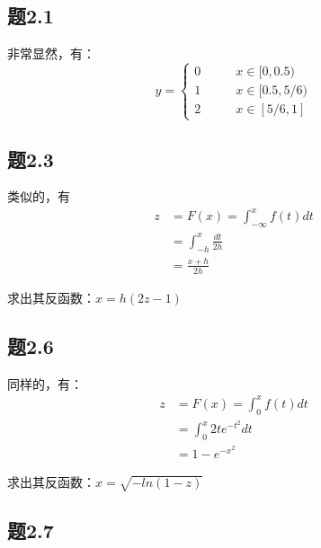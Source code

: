 \documentclass{article}
\begin{document}
	\section{}
	\subsection*{题2.1}
	\quad 
	
	非常显然，有：
	\begin{equation*}
		y=\left\{
			\begin{split}
				0\quad\quad&x\in[0,0.5)\\
				1\quad\quad&x\in[0.5,5/6)\\
				2\quad\quad&x\in[5/6,1]
			\end{split}	
		\right.
	\end{equation*}
	
	\subsection*{题2.3}
	\quad 
	
	类似的，有
	\begin{equation*}
		\begin{split}
			z&=F(x)=\int_{-\infty}^x f(t)dt\\
			&=\int_{-h}^x\frac{dt}{2h}\\
			&=\frac{x+h}{2h}
		\end{split}
	\end{equation*}
	
	求出其反函数：$x=h(2z-1)$
	
	\subsection*{题2.6}
	\quad 
	
	同样的，有：
	\begin{equation*}
		\begin{split}
			z&=F(x)=\int_0^x f(t)dt\\
			&=\int_0^x 2te^{-t^2}dt\\
			&=1-e^{-x^2}
		\end{split}
	\end{equation*}
	
	求出其反函数：$x=\sqrt{-ln(1-z)}$
	
	\subsection*{题2.7}
	\quad 
	
\end{document}
